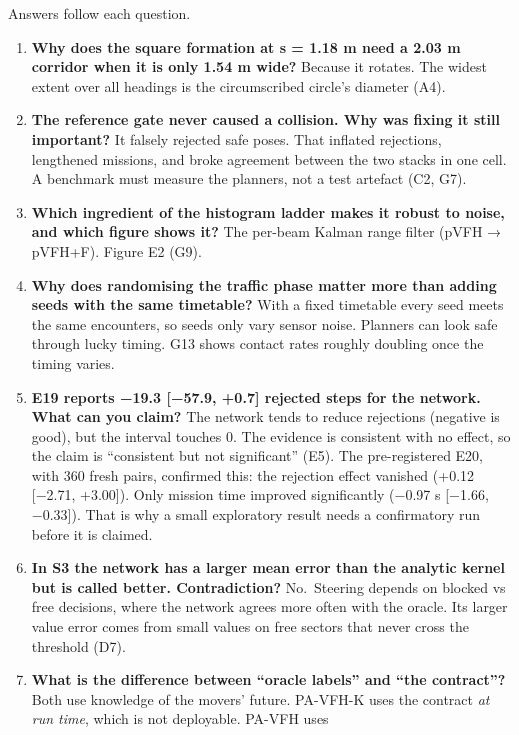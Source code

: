 \documentclass[
  10.5pt,
  a4paper,
]{article}
\begin{document}
Answers follow each question.

\begin{enumerate}
\def\labelenumi{\arabic{enumi}.}
\item
  \textbf{Why does the square formation at s = 1.18 m need a 2.03 m
  corridor when it is only 1.54 m wide?} Because it rotates. The widest
  extent over all headings is the circumscribed circle's diameter (A4).
\item
  \textbf{The reference gate never caused a collision. Why was fixing it
  still important?} It falsely rejected safe poses. That inflated
  rejections, lengthened missions, and broke agreement between the two
  stacks in one cell. A benchmark must measure the planners, not a test
  artefact (C2, G7).
\item
  \textbf{Which ingredient of the histogram ladder makes it robust to
  noise, and which figure shows it?} The per-beam Kalman range filter
  (pVFH → pVFH+F). Figure E2 (G9).
\item
  \textbf{Why does randomising the traffic phase matter more than adding
  seeds with the same timetable?} With a fixed timetable every seed
  meets the same encounters, so seeds only vary sensor noise. Planners
  can look safe through lucky timing. G13 shows contact rates roughly
  doubling once the timing varies.
\item
  \textbf{E19 reports −19.3 {[}−57.9, +0.7{]} rejected steps for the
  network. What can you claim?} The network tends to reduce rejections
  (negative is good), but the interval touches 0. The evidence is
  consistent with no effect, so the claim is ``consistent but not
  significant'' (E5). The pre-registered E20, with 360 fresh pairs,
  confirmed this: the rejection effect vanished (+0.12 {[}−2.71,
  +3.00{]}). Only mission time improved significantly (−0.97 s {[}−1.66,
  −0.33{]}). That is why a small exploratory result needs a confirmatory
  run before it is claimed.
\item
  \textbf{In S3 the network has a larger mean error than the analytic
  kernel but is called better. Contradiction?} No.~Steering depends on
  blocked vs free decisions, where the network agrees more often with
  the oracle. Its larger value error comes from small values on free
  sectors that never cross the threshold (D7).
\item
  \textbf{What is the difference between ``oracle labels'' and ``the
  contract''?} Both use knowledge of the movers' future. PA-VFH-K uses
  the contract \emph{at run time}, which is not deployable. PA-VFH uses

\end{enumerate}
\end{document}
